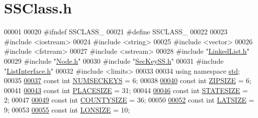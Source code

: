 \hypertarget{SSClass_8h_source}{}\section{S\+S\+Class.\+h}

\begin{DoxyCode}
00001 
00020 \textcolor{preprocessor}{#ifndef SSCLASS\_}
00021 \textcolor{preprocessor}{#define SSCLASS\_}
00022 
00023 \textcolor{preprocessor}{#include <iostream>}
00024 \textcolor{preprocessor}{#include <string>}
00025 \textcolor{preprocessor}{#include <vector>}
00026 \textcolor{preprocessor}{#include <fstream>}
00027 \textcolor{preprocessor}{#include <sstream>}
00028 \textcolor{preprocessor}{#include "\hyperlink{LinkedList_8h}{LinkedList.h}"}
00029 \textcolor{preprocessor}{#include "\hyperlink{Node_8h}{Node.h}"}
00030 \textcolor{preprocessor}{#include "\hyperlink{SecKeySS_8h}{SecKeySS.h}"}
00031 \textcolor{preprocessor}{#include "\hyperlink{ListInterface_8h}{ListInterface.h}"}
00032 \textcolor{preprocessor}{#include <limits>}
00033 
00034 \textcolor{keyword}{using namespace }\hyperlink{namespacestd}{std};
00035 
\hyperlink{SSClass_8h_ad0b49971b6f96c3d0772461b5de08c1a}{00037} \textcolor{keyword}{const} \textcolor{keywordtype}{int} \hyperlink{SSClass_8h_ad0b49971b6f96c3d0772461b5de08c1a}{NUMSECKEYS} = 6;
00038 
\hyperlink{SSClass_8h_afed733ffdf6aafbaf75b52ea1999b6b4}{00040} \textcolor{keyword}{const} \textcolor{keywordtype}{int} \hyperlink{SSClass_8h_afed733ffdf6aafbaf75b52ea1999b6b4}{ZIPSIZE} = 6;
00041 
\hyperlink{SSClass_8h_a6802669f0c794331636a12aad9da53f5}{00043} \textcolor{keyword}{const} \textcolor{keywordtype}{int} \hyperlink{SSClass_8h_a6802669f0c794331636a12aad9da53f5}{PLACESIZE} = 31;
00044 
\hyperlink{SSClass_8h_afca7ce02d5a6576fdfbd5e9ec81907d9}{00046} \textcolor{keyword}{const} \textcolor{keywordtype}{int} \hyperlink{SSClass_8h_afca7ce02d5a6576fdfbd5e9ec81907d9}{STATESIZE} = 2;
00047 
\hyperlink{SSClass_8h_a5abe6ba10e2e2da36a217ddc89de08ca}{00049} \textcolor{keyword}{const} \textcolor{keywordtype}{int} \hyperlink{SSClass_8h_a5abe6ba10e2e2da36a217ddc89de08ca}{COUNTYSIZE} = 36;
00050 
\hyperlink{SSClass_8h_a68fc5e9dd6f56a07f44be183f6e4838b}{00052} \textcolor{keyword}{const} \textcolor{keywordtype}{int} \hyperlink{SSClass_8h_a68fc5e9dd6f56a07f44be183f6e4838b}{LATSIZE} = 9;
00053 
\hyperlink{SSClass_8h_a6f928b3e03e80473ea43f148bdb39156}{00055} \textcolor{keyword}{const} \textcolor{keywordtype}{int} \hyperlink{SSClass_8h_a6f928b3e03e80473ea43f148bdb39156}{LONSIZE} = 10;

\end{DoxyCode}

